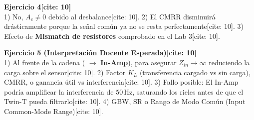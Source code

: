 \documentclass[11pt, a4paper]{article}
\begin{document}
\textbf{Ejercicio 4[cite: 10]} \\
1) No, $A_c \neq 0$ debido al desbalance[cite: 10]. 2) El CMRR disminuirá drásticamente porque la señal común ya no se resta perfectamente[cite: 10]. 3) Efecto de \textbf{Mismatch de resistores} comprobado en el Lab 3[cite: 10].

\textbf{Ejercicio 5 (Interpretación Docente Esperada)[cite: 10]} \\
1) Al frente de la cadena ( $\rightarrow$ \textbf{In-Amp}), para asegurar $Z_{in} \to \infty$ reduciendo la carga sobre el sensor[cite: 10].
2) Factor $K_L$ (transferencia cargado vs sin carga), CMRR, o ganancia útil vs interferencia[cite: 10].
3) Fallo posible: El In-Amp podría amplificar la interferencia de $50\,\text{Hz}$, saturando los rieles antes de que el Twin-T pueda filtrarlo[cite: 10].
4) GBW, SR o Rango de Modo Común (Input Common-Mode Range)[cite: 10].
\end{document}
